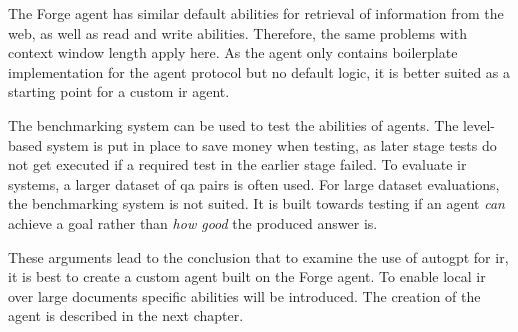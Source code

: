 \documentclass[../main.tex]{subfiles}
\begin{document}
The Forge agent has similar default abilities for retrieval of information from the web,
as well as read and write abilities.
Therefore, the same problems with context window length apply here.
As the agent only contains boilerplate implementation for the agent protocol
but no default logic,
it is better suited as a starting point for a custom \gls{ir} agent.

The benchmarking system can be used to test the abilities of agents.
The level-based system is put in place to save money when testing,
as later stage tests do not get executed if a required test in the earlier
stage failed.
To evaluate \gls{ir} systems, a larger dataset of \gls{qa} pairs is often used.
For large dataset evaluations, the benchmarking system is not suited.
It is built towards testing if an agent \emph{can} achieve a goal
rather than \emph{how good} the produced answer is.

These arguments lead to the conclusion that to examine the use of \gls{autogpt}
for \gls{ir}, it is best to create a custom agent built on the Forge agent.
To enable local \gls{ir} over large documents specific abilities will be introduced.
The creation of the agent is described in the next chapter.
\end{document}
